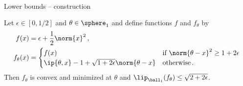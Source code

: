 
\begin{frame}{Lower bounds -- construction}
    \begin{tcolorbox}[title=Lower bound construction, colback=gray!5, colframe=gray!60!black]
        Let $\epsilon \in [0,1/2]$ and $\theta \in \sphere_1$ and define functions $f$ and $f_\theta$ by
        \begin{align*}
            f(x)        & = \epsilon + \frac{1}{2} \norm{x}^2\,,                                                                             \\
            f_\theta(x) & = \begin{cases}
                                f(x)                                                        & \text{if } \norm{\theta - x}^2 \geq 1 + 2 \epsilon \\
                                \ip{\theta, x} - 1 + \sqrt{1 + 2\epsilon} \norm{\theta - x} & \text{otherwise} \,.
                            \end{cases}
        \end{align*}
        Then $f_\theta$ is convex and minimized at $\theta$ and $\lip_{\ball_1}(f_\theta) \leq \sqrt{2 + 2\epsilon}$.
    \end{tcolorbox}
\end{frame}
